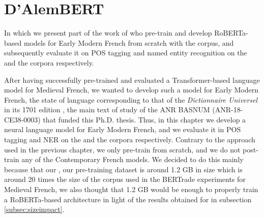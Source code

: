 \chapter{D'AlemBERT}\label{chap:dalembert}

\begin{center}
    \begin{minipage}{0.66\textwidth}
        \begin{small}
            In which we present part of the work of \citet{gabay-etal-2022-from} who pre-train and develop RoBERTa-based \citep{liu-etal-2019-roberta} models for Early Modern French from scratch with the \freemmax corpus, and subsequently evaluate it on POS tagging and named entity recognition on the \freemlpm and the \freemner corpora respectively.\footnotemark
        \end{small}
    \end{minipage}
    \vspace{0.5cm}
\end{center}


After having successfully pre-trained and evaluated a Transformer-based language model for Medieval French, we wanted to develop such a model for Early Modern French, the state of language corresponding to that of the \emph{Dictionnaire Universel} in its 1701 edition \citep{furetiere-1701-dictionnaire}, the main text of study of the ANR BASNUM (ANR-18-CE38-0003) that funded this Ph.D. thesis. Thus, in this chapter we develop \dalembert a neural language model for Early Modern French, and we evaluate it in POS tagging and NER on the \freemlpm and the \freemner corpora respectively. Contrary to the approach used in the previous chapter, we only pre-train \dalembert from scratch, and we do not post-train any of the Contemporary French models. We decided to do this mainly because that our \freemmax, our pre-training dataset is around 1.2 GB in size which is around 20 times the size of the corpus used in the BERTrade experiments for Medieval French, we also thought that 1.2 GB would be enough to properly train a RoBERTa-based architecture in light of the results obtained for \camembert in subsection \ref{subsec:sizeimpact}.

